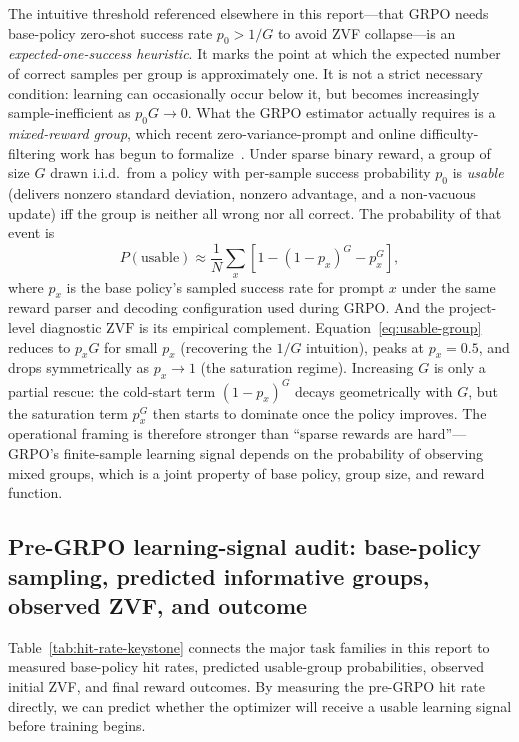 \documentclass[12pt,a4paper]{report}
\newcommand{\zvf}{\mathrm{ZVF}}
\begin{document}
The intuitive threshold referenced elsewhere in this report---that GRPO needs base-policy zero-shot success rate $p_0>1/G$ to avoid ZVF collapse---is an \emph{expected-one-success heuristic}. It marks the point at which the expected number of correct samples per group is approximately one. It is not a strict necessary condition: learning can occasionally occur below it, but becomes increasingly sample-inefficient as $p_0 G \to 0$. What the GRPO estimator actually requires is a \emph{mixed-reward group}, which recent zero-variance-prompt and online difficulty-filtering work has begun to formalize~\citep{rlzvp2025,bae2025online,rcgrpo2026}. Under sparse binary reward, a group of size $G$ drawn i.i.d.\ from a policy with per-sample success probability $p_0$ is \emph{usable} (delivers nonzero standard deviation, nonzero advantage, and a non-vacuous update) iff the group is neither all wrong nor all correct. The probability of that event is
\begin{equation}
  P(\text{usable}) \approx \frac{1}{N}\sum_x \left[1 - (1-p_x)^G - p_x^G\right],
  \label{eq:usable-group}
\end{equation}
where $p_x$ is the base policy's sampled success rate for prompt $x$ under the same reward parser and decoding configuration used during GRPO. And the project-level diagnostic $\zvf$ is its empirical complement. Equation~\eqref{eq:usable-group} reduces to $p_x G$ for small $p_x$ (recovering the $1/G$ intuition), peaks at $p_x=0.5$, and drops symmetrically as $p_x\to 1$ (the saturation regime). Increasing $G$ is only a partial rescue: the cold-start term $(1-p_x)^G$ decays geometrically with $G$, but the saturation term $p_x^G$ then starts to dominate once the policy improves. The operational framing is therefore stronger than ``sparse rewards are hard''---GRPO's finite-sample learning signal depends on the probability of observing mixed groups, which is a joint property of base policy, group size, and reward function.

\subsection*{Pre-GRPO learning-signal audit: base-policy sampling, predicted informative groups, observed ZVF, and outcome}

Table~\ref{tab:hit-rate-keystone} connects the major task families in this report to measured base-policy hit rates, predicted usable-group probabilities, observed initial ZVF, and final reward outcomes. By measuring the pre-GRPO hit rate directly, we can predict whether the optimizer will receive a usable learning signal before training begins.
\end{document}
